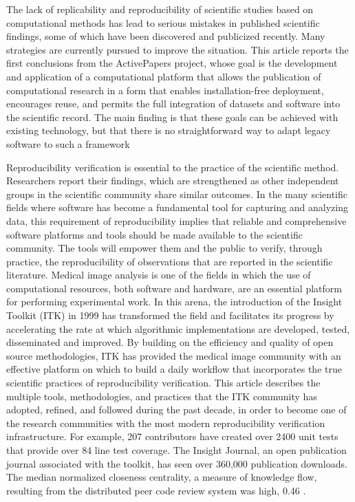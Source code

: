 

The lack of replicability and reproducibility of scientific studies based on
computational methods has lead to serious mistakes in published scientific
findings, some of which have been discovered and publicized recently. Many
strategies are currently pursued to improve the situation. This article reports the
first conclusions from the ActivePapers project, whose goal is the development
and application of a computational platform that allows the publication of
computational research in a form that enables installation-free deployment,
encourages reuse, and permits the full integration of datasets and software into
the scientific record. The main finding is that these goals can be achieved with
existing technology, but that there is no straightforward way to adapt legacy
software to such a framework \cite{hinsen2014activepapers}

Reproducibility verification is essential to the practice of the scientific method.
Researchers report their findings, which are strengthened as other independent groups
in the scientific community share similar outcomes. In the many scientific fields
where software has become a fundamental tool for capturing and analyzing data, this
requirement of reproducibility implies that reliable and comprehensive software platforms
and tools should be made available to the scientific community. The tools will empower
them and the public to verify, through practice, the reproducibility of observations that
are reported in the scientific literature. Medical image analysis is one of the fields in
which the use of computational resources, both software and hardware, are an essential
platform for performing experimental work. In this arena, the introduction of the Insight
Toolkit (ITK) in 1999 has transformed the field and facilitates its progress by accelerating
the rate at which algorithmic implementations are developed, tested, disseminated and
improved. By building on the efficiency and quality of open source methodologies, ITK has
provided the medical image community with an effective platform on which to build a daily
workflow that incorporates the true scientific practices of reproducibility verification. This
article describes the multiple tools, methodologies, and practices that the ITK community
has adopted, refined, and followed during the past decade, in order to become one of the
research communities with the most modern reproducibility verification infrastructure. For
example, 207 contributors have created over 2400 unit tests that provide over 84%
line test coverage. The Insight Journal, an open publication journal associated with the
toolkit, has seen over 360,000 publication downloads. The median normalized closeness
centrality, a measure of knowledge flow, resulting from the distributed peer code review
system was high, 0.46 \cite{McCormick2014}.


